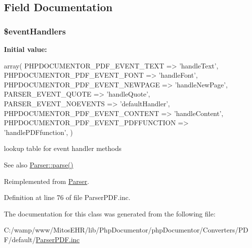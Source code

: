 \subsection{\-Field \-Documentation}
\hypertarget{class_p_d_f_parser_a430675102684e9ab820c7622678832b0}{
\subsubsection[{\$event\-Handlers}]{\setlength{\rightskip}{0pt plus 5cm}\$event\-Handlers}}\label{class_p_d_f_parser_a430675102684e9ab820c7622678832b0}
{\bfseries \-Initial value\-:}
\begin{DoxyCode}
 array(
            PHPDOCUMENTOR_PDF_EVENT_TEXT => 'handleText',
            PHPDOCUMENTOR_PDF_EVENT_FONT => 'handleFont',
            PHPDOCUMENTOR_PDF_EVENT_NEWPAGE => 'handleNewPage',
            PARSER_EVENT_QUOTE => 'handleQuote',
            PARSER_EVENT_NOEVENTS => 'defaultHandler',
            PHPDOCUMENTOR_PDF_EVENT_CONTENT => 'handleContent',
            PHPDOCUMENTOR_PDF_EVENT_PDFFUNCTION => 'handlePDFfunction',
            )
\end{DoxyCode}
lookup table for event handler methods \begin{DoxySeeAlso}{\-See also}
\hyperlink{class_parser_a20139dbf0050f44b70e34bf32d89d7e4}{\-Parser\-::parse()} 
\end{DoxySeeAlso}


\-Reimplemented from \hyperlink{class_parser_a430675102684e9ab820c7622678832b0}{\-Parser}.



\-Definition at line 76 of file \-Parser\-P\-D\-F.\-inc.



\-The documentation for this class was generated from the following file\-:\begin{DoxyCompactItemize}
\item 
\-C\-:/wamp/www/\-Mitos\-E\-H\-R/lib/\-Php\-Documentor/php\-Documentor/\-Converters/\-P\-D\-F/default/\hyperlink{_parser_p_d_f_8inc}{\-Parser\-P\-D\-F.\-inc}\end{DoxyCompactItemize}
